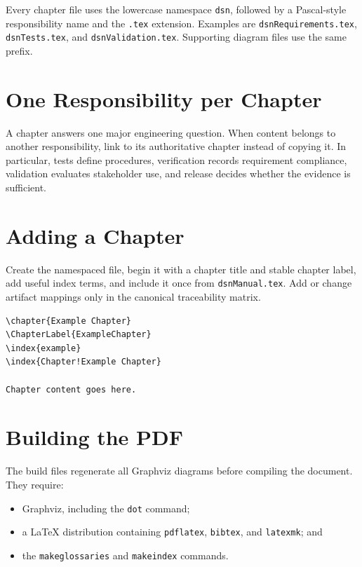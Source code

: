 Every chapter file uses the lowercase namespace \texttt{dsn}, followed by a
Pascal-style responsibility name and the \texttt{.tex} extension. Examples are
\texttt{dsnRequirements.tex}, \texttt{dsnTests.tex}, and
\texttt{dsnValidation.tex}. Supporting diagram files use the same prefix.

\section{One Responsibility per Chapter}

A chapter answers one major engineering question. When content belongs
to another responsibility, link to its authoritative chapter instead of
copying it. In particular, tests define procedures, verification records
requirement compliance, validation evaluates stakeholder use, and release
decides whether the evidence is sufficient.

\section{Adding a Chapter}

Create the namespaced file, begin it with a chapter title and stable chapter
label, add useful index terms, and include it once from
\texttt{dsnManual.tex}. Add or change artifact mappings only in the canonical
traceability matrix.

\begin{verbatim}
\chapter{Example Chapter}
\ChapterLabel{ExampleChapter}
\index{example}
\index{Chapter!Example Chapter}

Chapter content goes here.
\end{verbatim}

\section{Building the PDF}

The build files regenerate all Graphviz diagrams before compiling the document. They require:

\begin{itemize}
  \item Graphviz, including the \texttt{dot} command;
  \item a LaTeX distribution containing \texttt{pdflatex}, \texttt{bibtex}, and \texttt{latexmk}; and
  \item the \texttt{makeglossaries} and \texttt{makeindex} commands.
\end{itemize}

